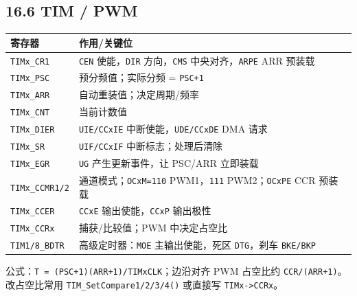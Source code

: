 \documentclass[UTF8,zihao=-5]{ctexart}
\renewcommand{\arraystretch}{0.9}
\begin{document}
\begin{multicols*}{2}
\subsection*{16.6 TIM / PWM}
{\scriptsize\setlength{\tabcolsep}{1.8pt}\renewcommand{\arraystretch}{0.88}%
\begin{tabularx}{\linewidth}{@{}*{2}{Y}@{}}
\toprule
\textbf{寄存器} & \textbf{作用/关键位} \\
\midrule
\texttt{TIMx\_CR1} & \texttt{CEN} 使能，\texttt{DIR} 方向，\texttt{CMS} 中央对齐，\texttt{ARPE} ARR 预装载 \\
\texttt{TIMx\_PSC} & 预分频值；实际分频 = \texttt{PSC+1} \\
\texttt{TIMx\_ARR} & 自动重装值；决定周期/频率 \\
\texttt{TIMx\_CNT} & 当前计数值 \\
\texttt{TIMx\_DIER} & \texttt{UIE/CCxIE} 中断使能，\texttt{UDE/CCxDE} DMA 请求 \\
\texttt{TIMx\_SR} & \texttt{UIF/CCxIF} 中断标志；处理后清除 \\
\texttt{TIMx\_EGR} & \texttt{UG} 产生更新事件，让 PSC/ARR 立即装载 \\
\texttt{TIMx\_CCMR1/2} & 通道模式；\texttt{OCxM=110} PWM1，\texttt{111} PWM2；\texttt{OCxPE} CCR 预装载 \\
\texttt{TIMx\_CCER} & \texttt{CCxE} 输出使能，\texttt{CCxP} 输出极性 \\
\texttt{TIMx\_CCRx} & 捕获/比较值；PWM 中决定占空比 \\
\texttt{TIM1/8\_BDTR} & 高级定时器：\texttt{MOE} 主输出使能，死区 \texttt{DTG}，刹车 \texttt{BKE/BKP} \\
\bottomrule
\end{tabularx}}
公式：\texttt{T = (PSC+1)(ARR+1)/TIMxCLK}；边沿对齐 PWM 占空比约 \texttt{CCR/(ARR+1)}。改占空比常用 \texttt{TIM\_SetCompare1/2/3/4()} 或直接写 \texttt{TIMx-\textgreater{}CCRx}。\par

\end{multicols*}
\end{document}
